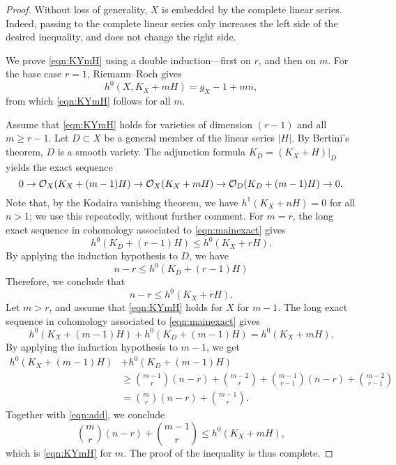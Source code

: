 \begin{proof}
  Without loss of generality, $X$ is embedded by the complete linear series.
  Indeed, passing to the complete linear series only increases the left side of the desired inequality, and does not change the right side.
  
  We prove \eqref{eqn:KYmH} using a double induction---first on $r$, and then on $m$.
  For the base case $r = 1$, Riemann--Roch gives
  \begin{equation}\label{eqn:r1}
    h^0(X, K_X + mH) = g_X - 1 + mn,
  \end{equation}
  from which \eqref{eqn:KYmH} follows for all $m$.

  Assume that \eqref{eqn:KYmH} holds for varieties of dimension $(r-1)$ and all $m \geq r-1$.
  Let $D \subset X$ be a general member of the linear series $|H|$.
  By Bertini's theorem, $D$ is a smooth variety.
  The adjunction formula $K_D = (K_X + H)|_D$ yields the exact sequence
  \begin{equation}\label{eqn:mainexact}
    0 \to \mathcal O_X(K_X + (m-1)H) \to \mathcal O_X(K_X + mH) \to \mathcal O_D(K_D + (m-1)H) \to 0.
  \end{equation}
  Note that, by the Kodaira vanishing theorem, we have $h^1(K_X + nH) = 0$ for all $n > 1$; we use this repeatedly, without further comment.
  For $m = r$, the long exact sequence in cohomology associated to \eqref{eqn:mainexact} gives
  \[ h^0(K_D + (r-1)H) \leq h^0(K_X + rH).\]
  By applying the induction hypothesis to $D$, we have
  \begin{equation}
    n-r \leq h^0(K_D + (r-1)H)
  \end{equation}
  Therefore, we conclude that
  \begin{equation}
    n-r \leq h^0(K_X + rH).
  \end{equation}
  Let $m > r$, and assume that \eqref{eqn:KYmH} holds for $X$ for $m-1$.
  The long exact sequence in cohomology associated to \eqref{eqn:mainexact} gives
  \begin{equation}\label{eqn:add}
    h^0(K_X + (m-1)H) + h^0(K_D + (m-1)H) = h^0(K_X + mH).
  \end{equation}
  By applying the induction hypothesis to $m-1$, we get
  \begin{align*}
    h^0(K_X + (m-1)H) &+ h^0(K_D + (m-1)H)\\
                      &\geq{{m-1} \choose r}(n-r) + {{m-2} \choose {r}} + {{m-1} \choose {r-1}}(n-r) + {{m-2} \choose r-1} \\
                      &={m \choose r} (n-r) + {{m-1} \choose r}.
  \end{align*}
  Together with \eqref{eqn:add}, we conclude 
  \begin{equation}
    {m \choose r} (n-r) + {{m-1} \choose r} \leq h^0(K_X + mH), 
  \end{equation}
  which is \eqref{eqn:KYmH} for $m$.
  The proof of the inequality is thus complete.


\end{proof}
